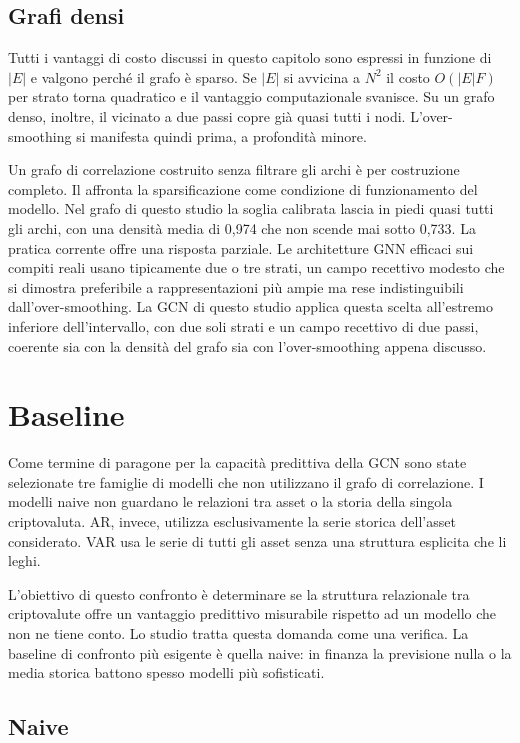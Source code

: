 \subsection{Grafi densi}
Tutti i vantaggi di costo discussi in questo capitolo sono espressi in funzione di $|E|$ e valgono perché il grafo è sparso. Se $|E|$ si avvicina a $N^2$ il costo $O(|E|F)$ per strato torna quadratico e il vantaggio computazionale svanisce. Su un grafo denso, inoltre, il vicinato a due passi copre già quasi tutti i nodi. L'over-smoothing si manifesta quindi prima, a profondità minore.

Un grafo di correlazione costruito senza filtrare gli archi è per costruzione completo. Il  affronta la sparsificazione come condizione di funzionamento del modello. Nel grafo di questo studio la soglia calibrata lascia in piedi quasi tutti gli archi, con una densità media di 0,974 che non scende mai sotto 0,733.
La pratica corrente offre una risposta parziale. Le architetture GNN efficaci sui compiti reali usano tipicamente due o tre strati, un campo recettivo modesto che si dimostra preferibile a rappresentazioni più ampie ma rese indistinguibili dall'over-smoothing. La GCN di questo studio applica questa scelta all'estremo inferiore dell'intervallo, con due soli strati e un campo recettivo di due passi, coerente sia con la densità del grafo sia con l'over-smoothing appena discusso.

\section{Baseline}
\label{sec:baselines}

Come termine di paragone per la capacità predittiva della GCN sono state selezionate tre famiglie di modelli che non utilizzano il grafo di correlazione. I modelli naive non guardano le relazioni tra asset o la storia della singola criptovaluta. AR, invece, utilizza esclusivamente la serie storica dell'asset considerato. VAR usa le serie di tutti gli asset senza una struttura esplicita che li leghi.

L'obiettivo di questo confronto è determinare se la struttura relazionale tra criptovalute offre un vantaggio predittivo misurabile rispetto ad un modello che non ne tiene conto. Lo studio tratta questa domanda come una verifica. La baseline di confronto più esigente è quella naive: in finanza la previsione nulla o la media storica battono spesso modelli più sofisticati.

\subsection{Naive}

